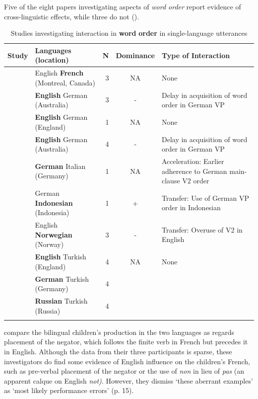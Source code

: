 \documentclass[output=paper]{langscibook}
\begin{document}
Five of the eight papers investigating aspects of \textit{word order} report evidence of cross-linguistic effects, while three do not ().

\begin{table}
\begin{tabularx}{\textwidth}{>{\raggedright}p{35mm}@{~~}Q@{}rcQ}
\lsptoprule
{ Study} & { Languages} { (location)} & { N}  & { Dominance} & { Type of Interaction}\\
\midrule
\citet{ParadisGenesee1996} & English \textbf{French} (Montreal, Canada) & 3 & NA & None\\
\citet{Dopke1998} & { \textbf{English} German} (Australia) & 3 & - & Delay in acquisition of word order in German VP \\
\citet{SinkaSchelleter1998} & { \textbf{English} German} (England) & 1 & NA & None\\
\citet{Döpke2000} & { \textbf{English} German} (Australia) & 4 & - & Delay in acquisition of word order in German VP \\
\citet{Hauser-GrüdlEtAl2010} & \textbf{German} Italian (Germany) & 1 & NA & Acceleration: Earlier adherence to German main-clause V2 order\\
\citet{AdnyaniEtAl2018} & German \textbf{Indonesian} (Indonesia) & 1 & + & Transfer: Use of German VP order in Indonesian \\
\citet{AndersenBentzen2018} & { English \textbf{Norwegian}} (Norway) & 3 & - & Transfer: Overuse of V2 in English \\
\citet{SağınŞimşekAntonovaÜnlü2021} & { \textbf{English} Turkish} (England) & 4 & NA & None\\
& { \textbf{German} Turkish} (Germany) & 4 &  & \\
& { \textbf{Russian} Turkish} (Russia) & 4 &  & \\
\lspbottomrule
\end{tabularx}
\caption{Studies investigating interaction in \textbf{word} \textbf{order} in single-language utterances}
\label{tab:vihmannvihmann:6}
\end{table}

\citet{ParadisGenesee1996} compare the bilingual children’s production in the two languages as regards placement of the negator, which follows the finite verb in French but precedes it in English. Although the data from their three participants is sparse, these investigators do find some evidence of English influence on the children’s French, such as pre-verbal placement of the negator or the use of \textit{non} in lieu of \textit{pas} (an apparent calque on English \textit{not)}. However, they dismiss ‘these aberrant examples’ as ‘most likely performance errors’ (p. 15). 
\end{document}
